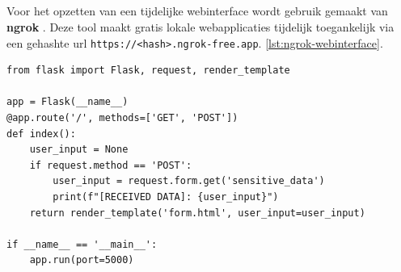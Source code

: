 
\subsection{}
\label{subsubsec:ngrok-webinterface}

Voor het opzetten van een tijdelijke webinterface wordt gebruik gemaakt van \textbf{ngrok} \autocite{Ngrok2025Flask}.
Deze tool maakt gratis lokale webapplicaties tijdelijk toegankelijk via een gehashte \gls{url} \texttt{https://<hash>.ngrok-free.app}.
\ref{lst:ngrok-webinterface}.

\begin{lstlisting}[style=custompython, label={lst:ngrok-webinterface}, caption={Ngrok configuratie voor Flask webinterface}, captionpos=b]
from flask import Flask, request, render_template

app = Flask(__name__)
@app.route('/', methods=['GET', 'POST'])
def index():
    user_input = None
    if request.method == 'POST':
        user_input = request.form.get('sensitive_data')
        print(f"[RECEIVED DATA]: {user_input}")
    return render_template('form.html', user_input=user_input)

if __name__ == '__main__':
    app.run(port=5000)
\end{lstlisting}

\subsection{}
\label{subsubsec:dataset-categorisering}

